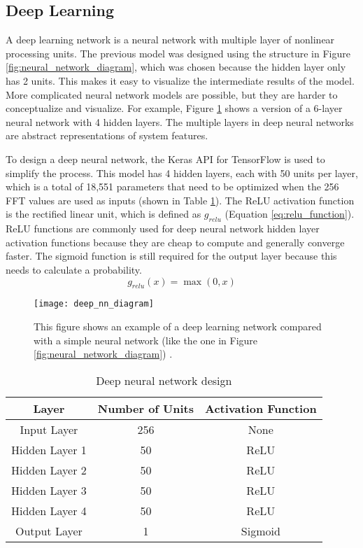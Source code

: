 \subsection{Deep Learning}
A deep learning network is a neural network with multiple layer of nonlinear processing units.  The previous model was designed using the structure in Figure \ref{fig:neural_network_diagram}, which was chosen because the hidden layer only has 2 units.  This makes it easy to visualize the intermediate results of the model.  More complicated neural network models are possible, but they are harder to conceptualize and visualize.  For example, Figure \ref{fig:deep_nn_diagram} shows a version of a 6-layer neural network with 4 hidden layers.  The multiple layers in deep neural networks are abstract representations of system features.

To design a deep neural network, the Keras \cite{keras} API for TensorFlow \cite{tensorflow} is used to simplify the process.  This model has 4 hidden layers, each with 50 units per layer, which is a total of 18,551 parameters that need to be optimized when the 256 FFT values are used as inputs (shown in Table \ref{t:deep_nn_design}).  The ReLU activation function is the rectified linear unit, which is defined as $g_{relu}$ (Equation \ref{eq:relu_function}).  ReLU functions are commonly used for deep neural network hidden layer activation functions because they are cheap to compute and generally converge faster.  The sigmoid function is still required for the output layer because this needs to calculate a probability.
\begin{equation} \label{eq:relu_function}
	g_{relu}(x) = \max{(0, x)}
\end{equation}

\begin{figure}
\centering
\texttt{[image: deep\_nn\_diagram]}
\decoRule
\caption{This figure shows an example of a deep learning network compared with a simple neural network (like the one in Figure \ref{fig:neural_network_diagram}) \cite{mnist_deep_learning}.}
\label{fig:deep_nn_diagram}
\end{figure}

\begin{table}[]
\centering
\caption{Deep neural network design}
\label{t:deep_nn_design}
\vspace*{0.2in}
\begin{tabular}{|c|c|c|}
\rowcolor[HTML]{EFEFEF} 
\hline
\textbf{Layer} & \textbf{Number of Units} & \textbf{Activation Function} \\ \hline
Input Layer & 256 & None \\ \hline
Hidden Layer 1 & 50 & ReLU \\ \hline
Hidden Layer 2 & 50 & ReLU \\ \hline
Hidden Layer 3 & 50 & ReLU \\ \hline
Hidden Layer 4 & 50 & ReLU \\ \hline
Output Layer & 1 & Sigmoid \\ \hline
\end{tabular}
\end{table}

